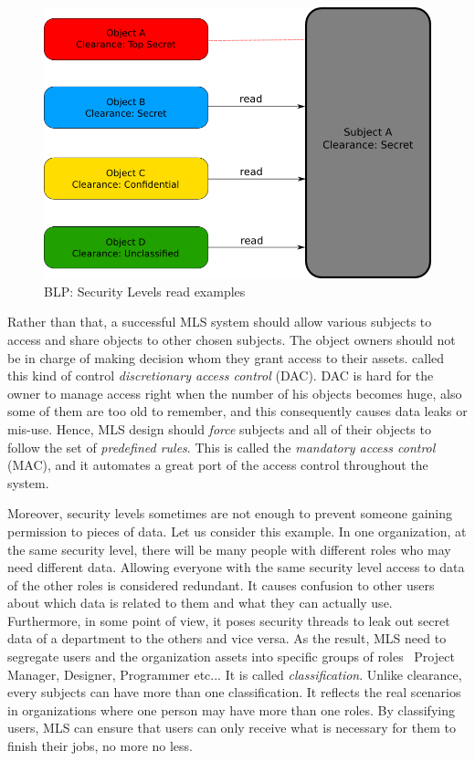 \begin{figure}[bth]                                                                                                                                                  
\myfloatalign
\includegraphics[width=1.0\linewidth]{gfx/chapter_2/security_level_read_example}
\caption[BLP: Security Levels read examples]{BLP: Security Levels read examples}\label{fig:security_level_read_example}
\end{figure}

Rather than that, a successful MLS system should allow various subjects to access and share objects to other chosen subjects.
The object owners should not be in charge of making decision whom they grant access to their assets. 
\citeauthor{prasun:1996} \cite{prasun:1996} called this kind of control \emph{discretionary access control} (DAC).
DAC is hard for the owner to manage access right when the number of his objects becomes huge, also some of them are too old to remember, and this consequently causes data leaks or mis-use.
Hence, MLS design should \emph{force} subjects and all of their objects to follow the set of \emph{predefined rules}.
This is called the \emph{mandatory access control} (MAC), and it automates a great port of the access control throughout the system.

Moreover, security levels sometimes are not enough to prevent someone gaining permission to pieces of data.
Let us consider this example. 
In one organization, at the same security level, there will be many people with different roles who may need different data.
Allowing everyone with the same security level access to data of the other roles is considered redundant.
It causes confusion to other users about which data is related to them and what they can actually use.
Furthermore, in some point of view, it poses security threads to leak out secret data of a department to the others and vice versa.
As the result, MLS need to segregate users and the organization assets into specific groups of roles \eg\ Project Manager, Designer, Programmer etc...
It is called \emph{classification}.
Unlike clearance, every subjects can have more than one classification.
It reflects the real scenarios in organizations where one person may have more than one roles.
By classifying users, MLS can ensure that users can only receive what is necessary for them to finish their jobs, no more no less.

